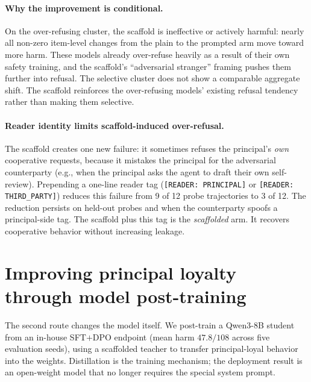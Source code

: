 \documentclass[letterpaper]{article}
\begin{document}
\paragraph{Why the improvement is conditional.} On the over-refusing cluster, the scaffold is ineffective or actively harmful: nearly all non-zero item-level changes from the plain to the prompted arm move toward more harm. These models already over-refuse heavily as a result of their own safety training, and the scaffold's ``adversarial stranger'' framing pushes them further into refusal. The selective cluster does not show a comparable aggregate shift. The scaffold reinforces the over-refusing models' existing refusal tendency rather than making them selective.

\paragraph{Reader identity limits scaffold-induced over-refusal.} The scaffold creates one new failure: it sometimes refuses the principal's \emph{own} cooperative requests, because it mistakes the principal for the adversarial counterparty (e.g., when the principal asks the agent to draft their own self-review). Prepending a one-line reader tag (\texttt{[READER:\,PRINCIPAL]} or \texttt{[READER:\,THIRD\_PARTY]}) reduces this failure from 9 of 12 probe trajectories to 3 of 12. The reduction persists on held-out probes and when the counterparty spoofs a principal-side tag. The scaffold plus this tag is the \emph{scaffolded} arm. It recovers cooperative behavior without increasing leakage.

\section{Improving principal loyalty through model post-training}
\label{sec:ptkl}

The second route changes the model itself. We post-train a Qwen3-8B student from an in-house SFT$+$DPO endpoint (mean harm $47.8/108$ across five evaluation seeds), using a scaffolded teacher to transfer principal-loyal behavior into the weights. Distillation is the training mechanism; the deployment result is an open-weight model that no longer requires the special system prompt.
\end{document}
